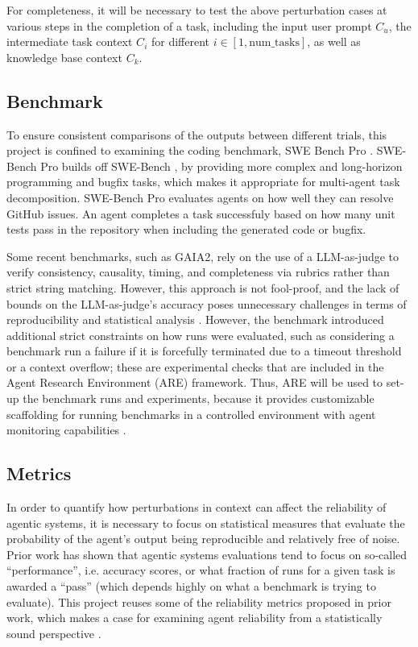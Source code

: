 \documentclass[conference]{IEEEtran}
\begin{document}
For completeness, it will be necessary to test the above perturbation cases at various steps in the
completion of a task, including the input user prompt $C_u$, the intermediate task context $C_i$ for
different $i \in [1, \text{num\_tasks}]$, as well as knowledge base context $C_k$.

\subsection{Benchmark}
To ensure consistent comparisons of the outputs between different trials, this project is confined
to examining the coding benchmark, SWE Bench Pro \cite{swebenchpro_2025}.
SWE-Bench Pro builds off SWE-Bench \cite{jimenez_swe-bench_2024}, by providing more complex and long-horizon 
programming and bugfix tasks, which makes it appropriate for multi-agent task decomposition.
SWE-Bench Pro evaluates agents on how well they can resolve GitHub issues.
An agent completes a task successfuly based on how many unit tests pass in the repository when
including the generated code or bugfix.

Some recent benchmarks, such as GAIA2, rely on the use of a LLM-as-judge
to verify consistency, causality, timing, and completeness via rubrics rather than strict string matching. 
However, this approach is not fool-proof, and the lack of bounds on the LLM-as-judge's accuracy
poses unnecessary challenges in terms of reproducibility and statistical analysis \cite{froger_gaia2_2026}.
However, the benchmark introduced additional strict constraints on how runs were evaluated,
such as considering a benchmark run a failure
if it is forcefully terminated due to a timeout threshold or a context overflow; these are experimental
checks that are included in the Agent Research Environment (ARE) framework.
Thus, ARE will be used to set-up the benchmark runs and experiments,
because it provides customizable scaffolding for running benchmarks in a
controlled environment with agent monitoring capabilities \cite{froger_are_2025,froger_gaia2_2026}.

\subsection{Metrics}
In order to quantify how perturbations in context can affect the reliability of agentic systems,
it is necessary to focus on statistical measures that evaluate the probability of the agent's output
being reproducible and relatively free of noise.
Prior work has shown that agentic systems evaluations tend to focus on so-called
``performance'', i.e. accuracy scores, or what fraction of runs for a given task is awarded a ``pass''
(which depends highly on what a benchmark is trying to evaluate).
This project reuses some of the reliability metrics proposed in prior work, which makes a case
for examining agent reliability from a statistically sound perspective \cite{rabanser_towards_2026}.
\end{document}
